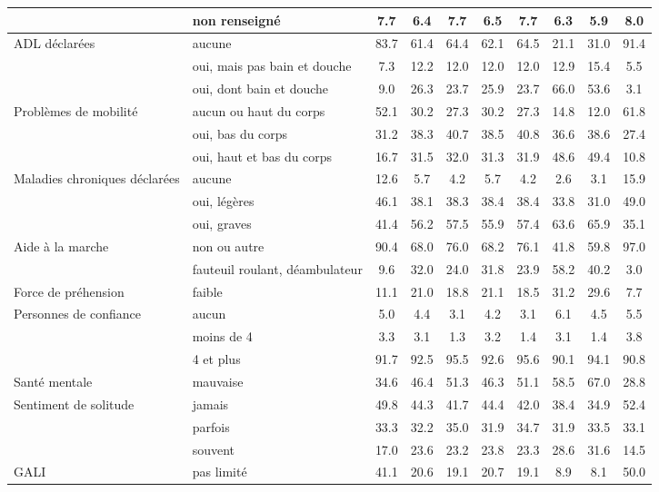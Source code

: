 \begin{Article}
\begin{refsection}[Bonnal]
\begin{appendices}
\begin{table}[!h]
{\begin{tabular}{l@{\;}l@{\;}S!{}S!{}S!{}S!{}S!{}S!{}S!{}S!{}}
		 & non renseigné & 7.7 & 6.4 & 7.7 & 6.5 & 7.7 & 6.3 & 5.9 & 8.0 \\\hline
		ADL déclarées & aucune & 83.7 & 61.4 & 64.4 & 62.1 & 64.5 & 21.1 &31.0 & 91.4 \\
		 & oui, mais pas bain et douche & 7.3 & 12.2 & 12.0 & 12.0 & 12.0 & 12.9 &15.4 & 5.5 \\
		 & oui, dont bain et douche & 9.0 & 26.3 & 23.7 & 25.9 & 23.7 & 66.0 &53.6 & 3.1 \\\hline
		Problèmes de mobilité & aucun ou haut du corps & 52.1 & 30.2 & 27.3 & 30.2 & 27.3 & 14.8 & 12.0 & 61.8 \\
		 & oui, bas du corps & 31.2 & 38.3 & 40.7 & 38.5 & 40.8 & 36.6 &38.6 & 27.4 \\
		 & oui, haut et bas du corps & 16.7 & 31.5 & 32.0 & 31.3 & 31.9 & 48.6 & 49.4 & 10.8 \\\hline
		Maladies chroniques déclarées & aucune & 12.6 & 5.7 & 4.2 & 5.7 & 4.2 & 2.6 & 3.1 & 15.9 \\
		 & oui, légères & 46.1 & 38.1 & 38.3 & 38.4 & 38.4 & 33.8 & 31.0 & 49.0 \\
		 & oui, graves & 41.4 & 56.2 & 57.5 & 55.9 & 57.4 & 63.6 & 65.9 & 35.1 \\ \hline
		Aide à la marche & non ou autre & 90.4 & 68.0 & 76.0 & 68.2 & 76.1 & 41.8 &59.8 & 97.0 \\
		 & fauteuil roulant, déambulateur & 9.6 & 32.0 & 24.0 & 31.8 & 23.9 & 58.2 & 40.2 & 3.0 \\\hline
		Force de préhension & faible  & 11.1 & 21.0 & 18.8 & 21.1 & 18.5 & 31.2 &29.6 & 7.7 \\\hline
		Personnes de confiance & aucun & 5.0 & 4.4 & 3.1 & 4.2 & 3.1 & 6.1 &4.5 & 5.5 \\
		 & moins de 4 & 3.3 & 3.1 & 1.3 & 3.2 & 1.4 & 3.1 &1.4 & 3.8 \\
		 & 4 et plus & 91.7 & 92.5 & 95.5 & 92.6 & 95.6 & 90.1 & 94.1 & 90.8 \\\hline
		Santé mentale & mauvaise & 34.6 & 46.4 & 51.3 & 46.3 & 51.1 & 58.5 & 67.0 & 28.8 \\\hline
		Sentiment de solitude & jamais & 49.8 & 44.3 & 41.7 & 44.4 & 42.0 & 38.4 & 34.9 & 52.4 \\
		 & parfois & 33.3 & 32.2 & 35.0 & 31.9 & 34.7 & 31.9 & 33.5 & 33.1 \\
		 & souvent & 17.0 & 23.6 & 23.2 & 23.8 & 23.3 & 28.6 & 31.6 & 14.5 \\\hline
		GALI & pas limité & 41.1 & 20.6 & 19.1 & 20.7 & 19.1 & 8.9 & 8.1 & 50.0 \\

\end{tabular}}
\end{table}
\end{appendices}
\end{refsection}
\end{Article}

